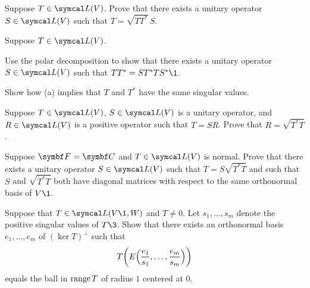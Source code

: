 \begin{exercises}
\exercise
Suppose $T \in \L(V)$. Prove that there exists a unitary operator $S \in \L(V)$ such that
$
T = \sqrt{TT^*}\, S$.


\exercise
Suppose $T \in \L(V)$.
\begin{subtheorem}
\item
Use the polar decomposition to show that there exists a unitary operator $S \in \L(V)$ such that
$TT^* = ST^*TS^*\1$.
\item
Show how (a) implies that $T$ and $T^*$ have the same singular values.
\end{subtheorem}
\exercisesubtheoremend


\exercise
Suppose $T \in \L(V)$, $S \in \L(V)$ is a unitary operator,
and $R \in \L(V)$ is a  positive operator such that $T = SR$.  Prove that
$R = \sqrt{T^* T}$.


\exercise
Suppose $\F{} = \C{}$ and $T \in \L(V)$ is normal. Prove that there exists a unitary operator $S \in \L(V)$ such that $T = S \sqrt{T^*T}$ and such that $S$ and $\sqrt{T^*T}$ both have diagonal matrices with respect to the same orthonormal basis of $V\1$. \label{8PolarNor}


\exercise
Suppose that $T \in \L(V\1,W)$ and $T \ne 0$. Let $s_1, \ldots, s_m$ denote the positive singular values of $T\3$. Show that there exists an orthonormal basis $e_1, \ldots, e_m$ of $(\ker T)^\perp$ such that
\[
T\paren[\bigg]{ E\paren[\Big]{ \frac{e_1}{s_1}, \ldots, \frac{e_m}{s_m} } }
\]
equals the ball in $\operatorname{range} T$ of radius $1$ centered at $0$.


\end{exercises}

\endinput 
